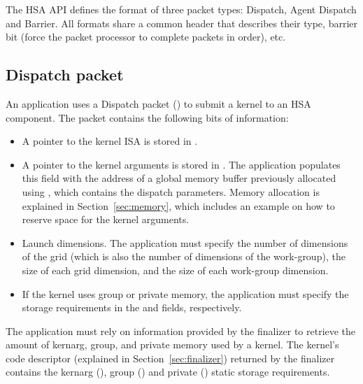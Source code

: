 \documentclass[final]{book}
\begin{document}
The HSA API defines the format of three packet types: Dispatch, Agent Dispatch
and Barrier. All formats share a common header  that
describes their type, barrier bit (force the packet processor to complete
packets in order), etc.

\subsection{Dispatch packet}\label{dispatch-packet}

An application uses a Dispatch packet () to
submit a kernel to an HSA component. The packet contains the following bits of
information:
\begin{itemize}[itemsep=1pt,topsep=3pt,partopsep=0pt]
\item A pointer to the kernel ISA is stored in
  .
\item A pointer to the kernel arguments is stored in
  . The application populates this
  field with the address of a global memory buffer previously allocated using
  , which contains the dispatch parameters. Memory
  allocation is explained in Section~\ref{sec:memory}, which includes an example
  on how to reserve space for the kernel arguments.
\item Launch dimensions. The application must specify the number of dimensions
  of the grid (which is also the number of dimensions of the work-group), the
  size of each grid dimension, and the size of each work-group dimension.
\item If the kernel uses group or private memory, the application must specify
  the storage requirements in the
   and
   fields, respectively.
\end{itemize}

The application must rely on information provided by the finalizer to retrieve
the amount of kernarg, group, and private memory used by a kernel. The kernel's
code descriptor (explained in Section~\ref{sec:finalizer}) returned by the
finalizer contains the kernarg
(), group
() and
private ()
static storage requirements.
\end{document}
